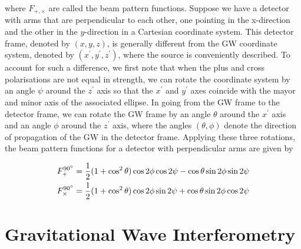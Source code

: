 \documentclass[binding=0.6cm, LaM]{sapthesis}
\begin{document}
        where $F_{+,\times}$ are called the beam pattern functions. Suppose we have a detector
        with arms that are perpendicular to each other, one pointing in the x-direction and the other
        in the $y$-direction in a Cartesian coordinate system. This detector frame, denoted by $(x,y,z)$,
        is generally different from the GW coordinate system, denoted by $(x^\prime,y^\prime,z^\prime)$, where the source
        is conveniently described. To account for such a difference, we first note that when the plus
        and cross polarisations are not equal in strength, we can rotate the coordinate system by
        an angle $\psi$ around the $z^\prime$ axis so that the $x^\prime$ and $y^\prime$ axes
        coincide with the mayor and minor axis of the associated ellipse.
        In going from the GW frame to the detector frame, we can rotate the GW frame by
        an angle $\theta$ around the $x^\prime$ axis and an angle $\phi$ around the $z^\prime$ axis,
        where the angles $(\theta, \phi)$ denote the direction of propagation of the GW in the detector frame.
        Applying these three rotations, the beam pattern functions for a detector with perpendicular arms are given by

                \begin{align}
                F_{+}^{\ang{90}}& = {1 \over 2} (1 + \cos^2 \theta)\cos 2\phi \cos 2 \psi - \cos \theta \sin2\phi \sin2\psi \\
                F_{\times}^{\ang{90}}& = {1 \over 2} (1 + \cos^2 \theta)\cos 2\phi \sin 2 \psi + \cos \theta \sin2\phi \cos2\psi
                \end{align}

\section{Gravitational Wave Interferometry}
\end{document}
